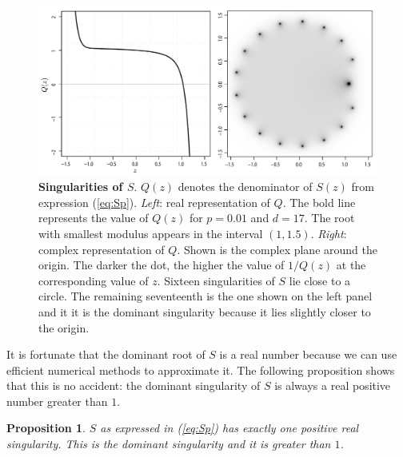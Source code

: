 \documentclass{article}
\newtheorem{proposition}{Proposition}
\begin{document}
\begin{figure}[h]
\centering
\includegraphics[scale=0.4]{singularityS.pdf}
\caption{\textbf{Singularities of $S$}. $Q(z)$ denotes the
denominator of $S(z)$ from expression (\ref{eq:Sp}). \textit{Left}: real
representation of $Q$. The bold line represents the value of $Q(z)$ for
$p=0.01$ and $d=17$. The root with smallest modulus appears in the
interval $(1, 1.5)$. \textit{Right}: complex representation of $Q$. Shown
is the complex plane around the origin. The darker the dot, the higher the
value of $1/Q(z)$ at the corresponding value of $z$. Sixteen singularities
of $S$ lie close to a circle. The remaining seventeenth is the one shown
on the left panel and it it is the dominant singularity because it lies
slightly closer to the origin.}
\label{fig:plotQ}
\end{figure}

It is fortunate that the dominant root of $S$ is a real number because we
can use efficient numerical methods to approximate it. The following
proposition shows that this is no accident: the dominant singularity of
$S$ is always a real positive number greater than $1$.

\begin{proposition}
\label{th:roots}
$S$ as expressed in (\ref{eq:Sp}) has exactly one positive real
singularity. This is the dominant singularity and it is greater than $1$.
\end{proposition}
\end{document}
